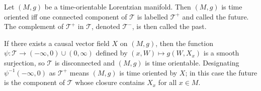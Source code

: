 Let $(M, g)$ be a time-orientable Lorentzian manifold. Then $(M, g)$ is time oriented iff one connected component of $\mathcal{T}$ is labelled $\mathcal{T}^+$ and called the future. The complement of $\mathcal{T}^+$ in $\mathcal{T}$, denoted $\mathcal{T}^-$, is then called the past.

If there exists a causal vector field $X$ on $(M, g)$, then the function $\psi: \mathcal{T} \to (-\infty, 0) \cup (0, \infty)$ defined by $(x, W) \mapsto g(W, X_x)$ is a smooth surjection, so $\mathcal{T}$ is disconnected and $(M, g)$ is time orientable. Designating $\psi^{-1}(-\infty, 0)$ as $\mathcal{T}^+$ means $(M, g)$ is time oriented by $X$; in this case the future is the component of $\mathcal{T}$ whose closure contains $X_x$ for all $x \in M$.
